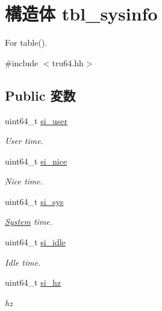 \hypertarget{structTru64_1_1tbl__sysinfo}{
\section{構造体 tbl\_\-sysinfo}
\label{structTru64_1_1tbl__sysinfo}
}


For table().  


{\ttfamily \#include $<$tru64.hh$>$}\subsection*{Public 変数}
\begin{DoxyCompactItemize}
\item 
uint64\_\-t \hyperlink{structTru64_1_1tbl__sysinfo_ad4a5a7ae9451778b6c8bbdc01e9453c7}{si\_\-user}
\begin{DoxyCompactList}\small\item\em User time. \item\end{DoxyCompactList}\item 
uint64\_\-t \hyperlink{structTru64_1_1tbl__sysinfo_aed9a8695776e5886c1616fd3c41d6d39}{si\_\-nice}
\begin{DoxyCompactList}\small\item\em Nice time. \item\end{DoxyCompactList}\item 
uint64\_\-t \hyperlink{structTru64_1_1tbl__sysinfo_a379c36837524ffda4336d4ec44dfed65}{si\_\-sys}
\begin{DoxyCompactList}\small\item\em \hyperlink{classSystem}{System} time. \item\end{DoxyCompactList}\item 
uint64\_\-t \hyperlink{structTru64_1_1tbl__sysinfo_a8fff4f4e29135600aaeb694cfb3295f1}{si\_\-idle}
\begin{DoxyCompactList}\small\item\em Idle time. \item\end{DoxyCompactList}\item 
uint64\_\-t \hyperlink{structTru64_1_1tbl__sysinfo_a9d1ee351cd7d391b91bc5059079e3d17}{si\_\-hz}
\begin{DoxyCompactList}\small\item\em hz \item\end{DoxyCompactList}\item 

\end{DoxyCompactItemize}
